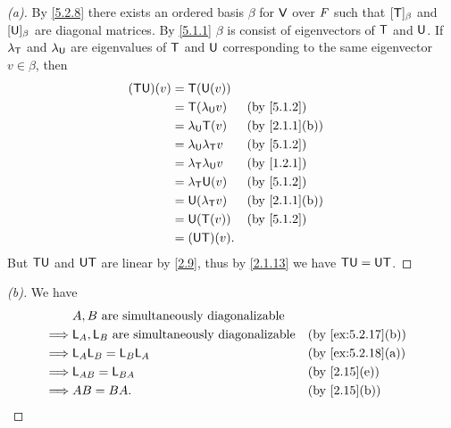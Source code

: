\begin{proof}[(a)]
  By \cref{5.2.8} there exists an ordered basis \(\beta\) for \(\mathsf{V}\) over \(\mathit{F}\) such that \([\mathsf{T}]_{\beta}\) and \([\mathsf{U}]_{\beta}\) are diagonal matrices.
  By \cref{5.1.1} \(\beta\) is consist of eigenvectors of \(\mathsf{T}\) and \(\mathsf{U}\).
  If \(\lambda_{\mathsf{T}}\) and \(\lambda_{\mathsf{U}}\) are eigenvalues of \(\mathsf{T}\) and \(\mathsf{U}\) corresponding to the same eigenvector \(v \in \beta\), then
  \begin{align*}
    (\T \U)(v) & = \T(\U(v))                                                    \\
               & = \T(\lambda_{\U} v)          &  & \text{(by \cref{5.1.2})}    \\
               & = \lambda_{\U} \T(v)          &  & \text{(by \cref{2.1.1}(b))} \\
               & = \lambda_{\U} \lambda_{\T} v &  & \text{(by \cref{5.1.2})}    \\
               & = \lambda_{\T} \lambda_{\U} v &  & \text{(by \ref{1.2.1})}     \\
               & = \lambda_{\T} \U(v)          &  & \text{(by \cref{5.1.2})}    \\
               & = \U(\lambda_{\T} v)          &  & \text{(by \cref{2.1.1}(b))} \\
               & = \U(\T(v))                   &  & \text{(by \cref{5.1.2})}    \\
               & = (\U \T)(v).
  \end{align*}
  But \(\mathsf{T} \mathsf{U}\) and \(\mathsf{U} \mathsf{T}\) are linear by \cref{2.9}, thus by \cref{2.1.13} we have \(\mathsf{T} \mathsf{U} = \mathsf{U} \mathsf{T}\).
\end{proof}

\begin{proof}[(b)]
  We have
  \begin{align*}
             & A, B \text{ are simultaneously diagonalizable}                                            \\
    \implies & \L_A, \L_B \text{ are simultaneously diagonalizable} &  & \text{(by \cref{ex:5.2.17}(b))} \\
    \implies & \L_A \L_B = \L_B \L_A                                &  & \text{(by \cref{ex:5.2.18}(a))} \\
    \implies & \L_{AB} = \L_{BA}                                    &  & \text{(by \cref{2.15}(e))}      \\
    \implies & AB = BA.                                             &  & \text{(by \cref{2.15}(b))}
  \end{align*}
\end{proof}

